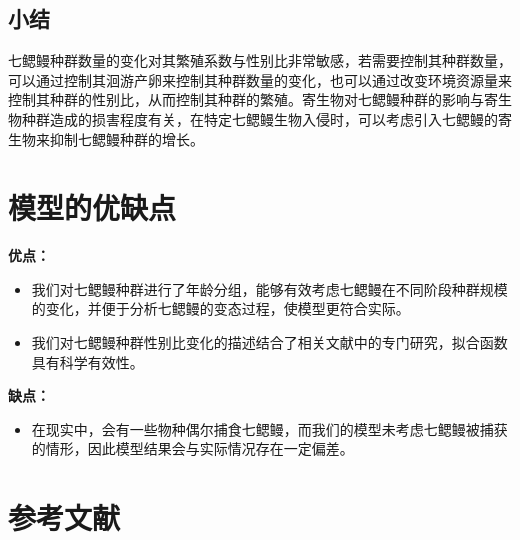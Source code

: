 \documentclass[11pt,a4paper]{ctexart}
\begin{document}
\subsection{小结}

七鳃鳗种群数量的变化对其繁殖系数与性别比非常敏感，若需要控制其种群数量，可以通过控制其洄游产卵来控制其种群数量的变化，也可以通过改变环境资源量来控制其种群的性别比，从而控制其种群的繁殖。寄生物对七鳃鳗种群的影响与寄生物种群造成的损害程度有关，在特定七鳃鳗生物入侵时，可以考虑引入七鳃鳗的寄生物来抑制七鳃鳗种群的增长。

\section{模型的优缺点}

\textbf{优点：}

\begin{itemize}
\item 我们对七鳃鳗种群进行了年龄分组，能够有效考虑七鳃鳗在不同阶段种群规模的变化，并便于分析七鳃鳗的变态过程，使模型更符合实际。
\item 我们对七鳃鳗种群性别比变化的描述结合了相关文献中的专门研究，拟合函数具有科学有效性。
\end{itemize}

\textbf{缺点：}

\begin{itemize}
\item 在现实中，会有一些物种偶尔捕食七鳃鳗，而我们的模型未考虑七鳃鳗被捕获的情形，因此模型结果会与实际情况存在一定偏差。
\end{itemize}

\section*{参考文献}
\end{document}
